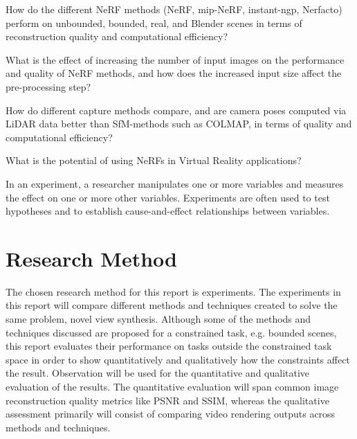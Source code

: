 
\begin{description}[leftmargin=!,labelwidth=\widthof{RQ 1:}]
\item[\textbf{RQ 1:}]
How do the different NeRF methods (NeRF, mip-NeRF, instant-ngp, Nerfacto) perform on unbounded, bounded, real, and Blender scenes in terms of reconstruction quality and computational efficiency?
\item[\textbf{RQ 2:}]
What is the effect of increasing the number of input images on the performance and quality of NeRF methods, and how does the increased input size affect the pre-processing step?
\item[\textbf{RQ 3:}]
How do different capture methods compare, and are camera poses computed via LiDAR data better than SfM-methods such as COLMAP, in terms of quality and computational efficiency?
\item[\textbf{RQ 4:}]
What is the potential of using NeRFs in Virtual Reality applications?
\end{description}



In an experiment, a researcher manipulates one or more variables and measures the effect on one or more other variables. Experiments are often used to test hypotheses and to establish cause-and-effect relationships between variables.

\section{Research Method}
The chosen research method for this report is experiments. The experiments in this report will compare different methods and techniques created to solve the same problem, novel view synthesis. Although some of the methods and techniques discussed are proposed for a constrained task, e.g. bounded scenes, this report evaluates their performance on tasks outside the constrained task space in order to show quantitatively and qualitatively how the constraints affect the result. Observation will be used for the quantitative and qualitative evaluation of the results. The quantitative evaluation will span common image reconstruction quality metrics like PSNR and SSIM, whereas the qualitative assessment primarily will consist of comparing video rendering outputs across methods and techniques.


